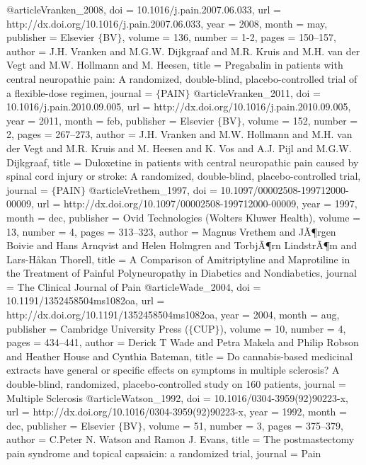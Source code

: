 @article{Vranken_2008,
	doi = {10.1016/j.pain.2007.06.033},
	url = {http://dx.doi.org/10.1016/j.pain.2007.06.033},
	year = 2008,
	month = {may},
	publisher = {Elsevier $\lbrace$BV$\rbrace$},
	volume = {136},
	number = {1-2},
	pages = {150--157},
	author = {J.H. Vranken and M.G.W. Dijkgraaf and M.R. Kruis and M.H. van der Vegt and M.W. Hollmann and M. Heesen},
	title = {Pregabalin in patients with central neuropathic pain: A randomized, double-blind, placebo-controlled trial of a flexible-dose regimen},
	journal = {$\lbrace$PAIN$\rbrace$}
}
@article{Vranken_2011,
	doi = {10.1016/j.pain.2010.09.005},
	url = {http://dx.doi.org/10.1016/j.pain.2010.09.005},
	year = 2011,
	month = {feb},
	publisher = {Elsevier $\lbrace$BV$\rbrace$},
	volume = {152},
	number = {2},
	pages = {267--273},
	author = {J.H. Vranken and M.W. Hollmann and M.H. van der Vegt and M.R. Kruis and M. Heesen and K. Vos and A.J. Pijl and M.G.W. Dijkgraaf},
	title = {Duloxetine in patients with central neuropathic pain caused by spinal cord injury or stroke: A randomized, double-blind, placebo-controlled trial},
	journal = {$\lbrace$PAIN$\rbrace$}
}
@article{Vrethem_1997,
	doi = {10.1097/00002508-199712000-00009},
	url = {http://dx.doi.org/10.1097/00002508-199712000-00009},
	year = 1997,
	month = {dec},
	publisher = {Ovid Technologies (Wolters Kluwer Health)},
	volume = {13},
	number = {4},
	pages = {313--323},
	author = {Magnus Vrethem and JÃ¶rgen Boivie and Hans Arnqvist and Helen Holmgren and TorbjÃ¶rn LindstrÃ¶m and Lars-H{\aa}kan Thorell},
	title = {A Comparison of Amitriptyline and Maprotiline in the Treatment of Painful Polyneuropathy in Diabetics and Nondiabetics},
	journal = {The Clinical Journal of Pain}
}
@article{Wade_2004,
	doi = {10.1191/1352458504ms1082oa},
	url = {http://dx.doi.org/10.1191/1352458504ms1082oa},
	year = 2004,
	month = {aug},
	publisher = {Cambridge University Press ($\lbrace$CUP$\rbrace$)},
	volume = {10},
	number = {4},
	pages = {434--441},
	author = {Derick T Wade and Petra Makela and Philip Robson and Heather House and Cynthia Bateman},
	title = {Do cannabis-based medicinal extracts have general or specific effects on symptoms in multiple sclerosis? A double-blind, randomized, placebo-controlled study on 160 patients},
	journal = {Multiple Sclerosis}
}
@article{Watson_1992,
	doi = {10.1016/0304-3959(92)90223-x},
	url = {http://dx.doi.org/10.1016/0304-3959(92)90223-x},
	year = 1992,
	month = {dec},
	publisher = {Elsevier $\lbrace$BV$\rbrace$},
	volume = {51},
	number = {3},
	pages = {375--379},
	author = {C.Peter N. Watson and Ramon J. Evans},
	title = {The postmastectomy pain syndrome and topical capsaicin: a randomized trial},
	journal = {Pain}
}
